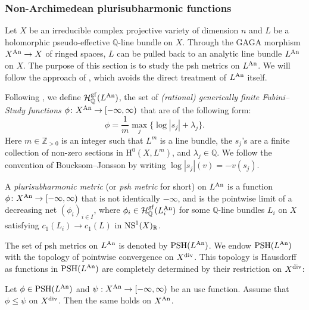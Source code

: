 \subsubsection{Non-Archimedean plurisubharmonic functions}
\label{subsubsec:BJ_NApsh}

Let $X$ be an irreducible complex projective variety of dimension $n$ and $L$ be a holomorphic pseudo-effective $\mathbb{Q}$-line bundle on $X$. Through the GAGA morphism $X^{\mathrm{An}}\rightarrow X$ of ringed spaces, $L$ can be pulled back to an analytic line bundle $L^{\mathrm{An}}$ on $X$. The purpose of this section is to study the psh metrics on $L^{\mathrm{An}}$. We will follow the approach of \cite{BJ22}, which avoids the direct treatment of $L^{\mathrm{An}}$ itself.

Following \cite[Definition~2.18]{BJ22}, we define $\mathcal{H}^{\mathrm{gf}}_{\mathbb{Q}}(L^{\mathrm{An}})$, the set of \emph{(rational) generically finite Fubini--Study functions} $\phi\colon X^{\mathrm{An}}\rightarrow [-\infty,\infty)$ that are of the following form:
    \begin{equation}
    \phi=\frac{1}{m}\max_j \{\log|s_j|+\lambda_j\}.
    \end{equation}
Here $m\in \mathbb{Z}_{>0}$ is an integer such that $L^m$ is a line bundle, the $s_j$'s are a finite collection of non-zero sections in $\mathrm{H}^0(X,L^m)$, and $\lambda_j\in \mathbb{Q}$. We follow the convention of Boucksom--Jonsson by writing $\log |s_j|(v)=-v(s_j)$.

\begin{definition}[{\cite[Definition~4.1]{BJ22}}]\label{def:BJpshmetric}
A \emph{plurisubharmonic metric} (or \emph{psh metric} for short) on $L^{\mathrm{An}}$ is a function $\phi\colon X^{\mathrm{An}}\rightarrow [-\infty,\infty)$ that is not identically $-\infty$, and is the pointwise limit of a decreasing net $(\phi_i)_{i\in I}$, where $\phi_i\in \mathcal{H}^{\mathrm{gf}}_{\mathbb{Q}}(L_i^{\mathrm{An}})$ for some $\mathbb{Q}$-line bundles $L_i$ on $X$ satisfying $c_1(L_i)\to c_1(L)$ in $\mathrm{NS}^1(X)_{\mathbb{R}}$.
\end{definition}


The set of psh metrics on $L^{\mathrm{An}}$ is denoted by $\mathrm{PSH}(L^{\mathrm{An}})$.
We endow $\mathrm{PSH}(L^{\mathrm{An}})$ with the topology of pointwise convergence on $X^{\operatorname{div}}$. This topology is Hausdorff as functions in $\mathrm{PSH}(L^{\mathrm{An}})$ are completely determined by their restriction on $X^{\operatorname{div}}$:
\begin{theorem}[{\cite[Theorem~4.22]{BJ22}}]\label{thm:pshdetbydiv}
Let $\phi \in\mathrm{PSH}(L^{\mathrm{An}})$ and $\psi:X^{\mathrm{An}}\rightarrow [-\infty,\infty)$ be an usc function. Assume that $\phi\leq \psi$ on $X^{\operatorname{div}}$. Then the same holds on $X^{\mathrm{An}}$.
\end{theorem}



